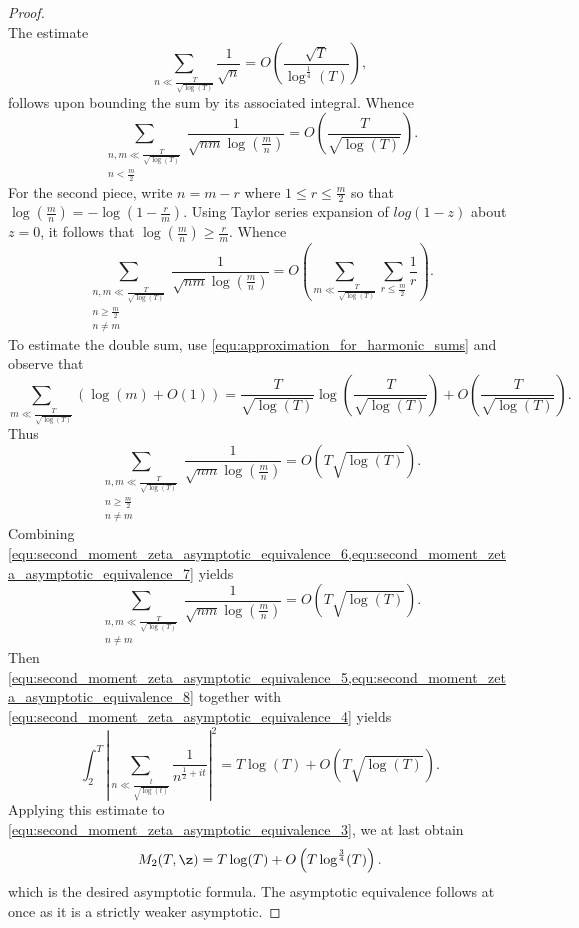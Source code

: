 \documentclass[12pt]{article}
\begin{document}
\begin{proof}
\[        \]
        The estimate
        \[
          \sum_{n \ll \frac{T}{\sqrt{\log(T)}}}\frac{1}{\sqrt{n}} = O\left(\frac{\sqrt{T}}{\log^{\frac{1}{4}}(T)}\right),
        \]
        follows upon bounding the sum by its associated integral. Whence
        \begin{equation}\label{equ:second_moment_zeta_asymptotic_equivalence_6}
          \sum_{\substack{n,m \ll \frac{T}{\sqrt{\log(T)}} \\ n < \frac{m}{2}}}\frac{1}{\sqrt{nm}\log\left(\frac{m}{n}\right)} = O\left(\frac{T}{\sqrt{\log(T)}}\right).
        \end{equation}
        For the second piece, write \(n = m-r\) where \(1 \le r \le \frac{m}{2}\) so that \(\log\left(\frac{m}{n}\right) = -\log(1-\frac{r}{m})\). Using Taylor series expansion of \(log(1-z)\) about \(z = 0\), it follows that \(\log\left(\frac{m}{n}\right) \ge \frac{r}{m}\). Whence
        \[
          \sum_{\substack{n,m \ll \frac{T}{\sqrt{\log(T)}} \\ n \ge \frac{m}{2} \\ n \neq m}}\frac{1}{\sqrt{nm}\log\left(\frac{m}{n}\right)} = O\left(\sum_{m \ll \frac{T}{\sqrt{\log(T)}}}\sum_{r \le \frac{m}{2}}\frac{1}{r}\right).
        \]
        To estimate the double sum, use \cref{equ:approximation_for_harmonic_sums} and observe that
        \[
          \sum_{m \ll \frac{T}{\sqrt{\log(T)}}}\left(\log(m)+O(1)\right) = \frac{T}{\sqrt{\log(T)}}\log\left(\frac{T}{\sqrt{\log(T)}}\right)+O\left(\frac{T}{\sqrt{\log(T)}}\right).
        \]
        Thus
        \begin{equation}\label{equ:second_moment_zeta_asymptotic_equivalence_7}
          \sum_{\substack{n,m \ll \frac{T}{\sqrt{\log(T)}} \\ n \ge \frac{m}{2} \\ n \neq m}}\frac{1}{\sqrt{nm}\log\left(\frac{m}{n}\right)} = O\left(T\sqrt{\log(T)}\right).
        \end{equation}
        Combining \cref{equ:second_moment_zeta_asymptotic_equivalence_6,equ:second_moment_zeta_asymptotic_equivalence_7} yields
        \begin{equation}\label{equ:second_moment_zeta_asymptotic_equivalence_8}
          \sum_{\substack{n,m \ll \frac{T}{\sqrt{\log(T)}} \\ n \neq m}}\frac{1}{\sqrt{nm}\log\left(\frac{m}{n}\right)} = O\left(T\sqrt{\log(T)}\right).
        \end{equation}
        Then \cref{equ:second_moment_zeta_asymptotic_equivalence_5,equ:second_moment_zeta_asymptotic_equivalence_8} together with \cref{equ:second_moment_zeta_asymptotic_equivalence_4} yields
        \[
          \int_{2}^{T}\left|\sum_{n \ll \frac{t}{\sqrt{\log(t)}}}\frac{1}{n^{\frac{1}{2}+it}}\right|^{2} = T\log(T)+O\left(T\sqrt{\log(T)}\right).
        \]
        Applying this estimate to \cref{equ:second_moment_zeta_asymptotic_equivalence_3}, we at last obtain
        \[
          M_{2}(T,\z) = T\log(T)+O\left(T\log^{\frac{3}{4}}(T)\right).
        \]
        which is the desired asymptotic formula. The asymptotic equivalence follows at once as it is a strictly weaker asymptotic.
      \end{proof}
      
\end{document}
